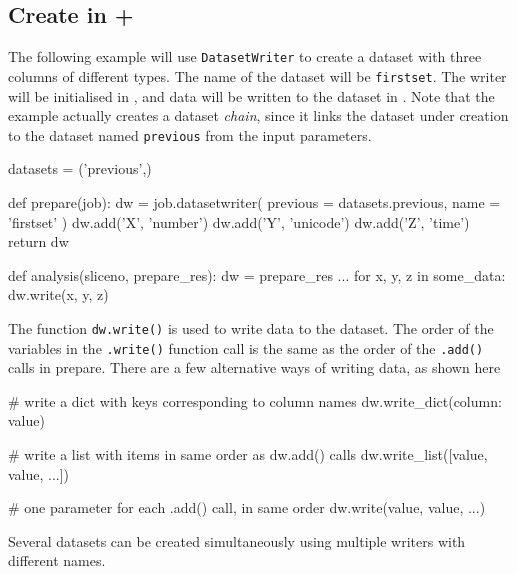 \subsection{Create in \prepare + \analysis}
\label{sec:create_dataset_in_analysis}
The following example will use \texttt{DatasetWriter} to create a
dataset with three columns of different types.  The name of the
dataset will be \texttt{firstset}.  The writer will be initialised
in \prepare, and data will be written to the dataset in \analysis.
Note that the example actually creates a dataset \emph{chain}, since
it links the dataset under creation to the dataset
named \texttt{previous} from the input parameters.
\begin{python}
datasets = ('previous',)

def prepare(job):
    dw = job.datasetwriter(
        previous = datasets.previous,
        name = 'firstset'
    )
    dw.add('X', 'number')
    dw.add('Y', 'unicode')
    dw.add('Z', 'time')
    return dw

def analysis(sliceno, prepare_res):
    dw = prepare_res
    ...
    for x, y, z in some_data:
        dw.write(x, y, z)
\end{python}
The function \texttt{dw.write()} is used to write data to the dataset.
The order of the variables in the \texttt{.write()} function call is
the same as the order of the \texttt{.add()} calls in prepare.  There
are a few alternative ways of writing data, as shown here
\begin{python}
    # write a dict with keys corresponding to column names
    dw.write_dict({column: value})

    # write a list with items in same order as dw.add() calls
    dw.write_list([value, value, ...])

    # one parameter for each .add() call, in same order
    dw.write(value, value, ...)
\end{python}
Several datasets can be created simultaneously using multiple writers
with different names.




